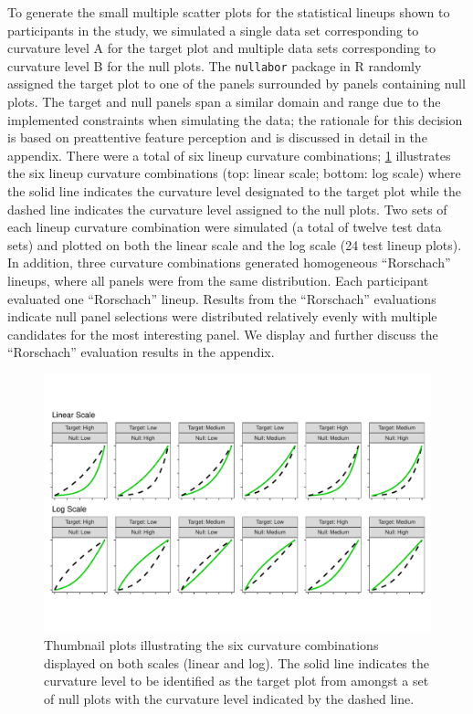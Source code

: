 \documentclass[12pt]{article}
\begin{document}
To generate the small multiple scatter plots for the statistical lineups
shown to participants in the study, we simulated a single data set
corresponding to curvature level A for the target plot and multiple data
sets corresponding to curvature level B for the null plots. The
\texttt{nullabor} package in R \citep{buja_statistical_2009} randomly
assigned the target plot to one of the panels surrounded by panels
containing null plots. The target and null panels span a similar domain
and range due to the implemented constraints when simulating the data;
the rationale for this decision is based on preattentive feature
perception \citep{wolfeWhatPreattentiveFeature2019} and is discussed in
detail in the appendix. There were a total of six lineup curvature
combinations; \cref{fig:curvature-combination-example} illustrates the
six lineup curvature combinations (top: linear scale; bottom: log scale)
where the solid line indicates the curvature level designated to the
target plot while the dashed line indicates the curvature level assigned
to the null plots. Two sets of each lineup curvature combination were
simulated (a total of twelve test data sets) and plotted on both the
linear scale and the log scale (24 test lineup plots). In addition,
three curvature combinations generated homogeneous ``Rorschach''
lineups, where all panels were from the same distribution. Each
participant evaluated one ``Rorschach'' lineup. Results from the
``Rorschach'' evaluations indicate null panel selections were
distributed relatively evenly with multiple candidates for the most
interesting panel. We display and further discuss the ``Rorschach''
evaluation results in the appendix.

\begin{figure}[tbp]

{\centering \includegraphics[width=1\linewidth,]{logarithmic-lineups-revisions_files/figure-latex/curvature-combination-example-1} 

}

\caption{Thumbnail plots illustrating the six curvature combinations displayed on both scales (linear and log). The solid line indicates the curvature level to be identified as the target plot from amongst a set of null plots with the curvature level indicated by the dashed line.}\label{fig:curvature-combination-example}
\end{figure}
\end{document}
